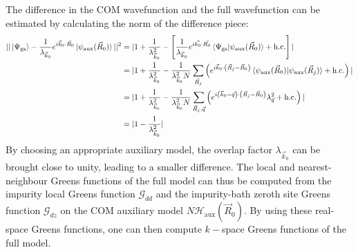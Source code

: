 \documentclass{report}
\numberwithin{equation}{section}
\begin{document}
The difference in the COM wavefunction and the full wavefunction can be estimated by calculating the norm of the difference piece:
\begin{equation}\begin{aligned}
	||\ket{\Psi_\text{gs}} - \frac{1}{\lambda_{\vec k_0}} e^{i\vec{k}_0\cdot\vec{R}_0} \ket{\psi_\text{aux}(\vec R_0)}||^2 &= |1 + \frac{1}{\lambda_{\vec k_0}^2} - \left[\frac{1}{\lambda_{\vec k_0}}e^{i \vec{k_0}\cdot\vec{R_0}}\braket{\Psi_\text{gs} | \psi_\text{aux}(\vec R_0)} + \text{h.c.}\right]| \\
	&=|1 + \frac{1}{\lambda_{\vec k_0}^2} - \frac{1}{\lambda_{\vec k_0}^2 N}\sum_{\vec R_j} \left(e^{i \vec k_0 \cdot \left( \vec R_j - \vec R_0 \right)}  \braket{\psi_\text{aux}(\vec R_0) | \psi_\text{aux}(\vec R_j) } + \text{h.c.}\right)|\\
	&=|1 + \frac{1}{\lambda_{\vec k_0}^2} - \frac{1}{\lambda_{\vec k_0}^2 N}\sum_{\vec R_j,\vec q} \left(e^{i \left(\vec k_0 - \vec q\right)\cdot \left( \vec R_j - \vec R_0 \right)}\lambda_{\vec q}^2 + \text{h.c.}\right)|\\
	&= |1 - \frac{1}{\lambda_{\vec k_0}^2}|
\end{aligned}\end{equation}
By choosing an appropriate auxiliary model, the overlap factor \(\lambda_{\vec k_0}\) can be brought close to unity, leading to a smaller difference. The local and nearest-neighbour Greens functions of the full model can thus be computed from the impurity local Greens function \(\mathcal{G}_{dd}\) and the impurity-bath zeroth site Greens function \(\mathcal{G}_{dz}\) on the COM auxiliary model \(N \mathcal{H}_\text{aux}(\vec R_0)\). By using these real-space Greens functions, one can then compute \(k-\)space Greens functions of the full model. 
\end{document}
